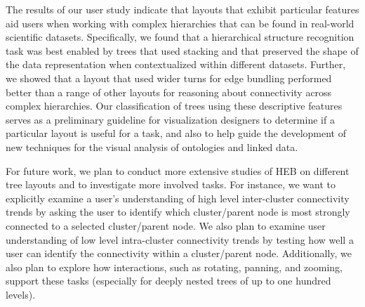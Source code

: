 \documentclass[a4paper]{llncs}
\begin{document}
The results of our user study indicate that layouts that exhibit particular features aid users when working with complex hierarchies that can be found in real-world scientific datasets. Specifically, we found that a hierarchical structure recognition task was best enabled by trees that used stacking and that preserved the shape of the data representation when contextualized within different datasets. Further, we showed that a layout that used wider turns for edge bundling performed better than a range of other layouts for reasoning about connectivity across complex hierarchies. Our classification of trees using these descriptive features serves as a preliminary guideline for visualization designers to determine if a particular layout is useful for a task, and also to help guide the development of new techniques for the visual analysis of ontologies and linked data.




For future work, we plan to conduct more extensive studies of HEB on different tree layouts and to investigate more involved tasks. For instance, we want to explicitly examine a user's understanding of high level inter-cluster connectivity trends by asking the user to identify which cluster/parent node is most strongly connected to a selected cluster/parent node. We also plan to examine user understanding of low level intra-cluster connectivity trends by testing how well a user can identify the connectivity within a cluster/parent node. Additionally, we also plan to explore how interactions, such as rotating, panning, and zooming, support these tasks (especially for deeply nested trees of up to one hundred levels). 
\end{document}
